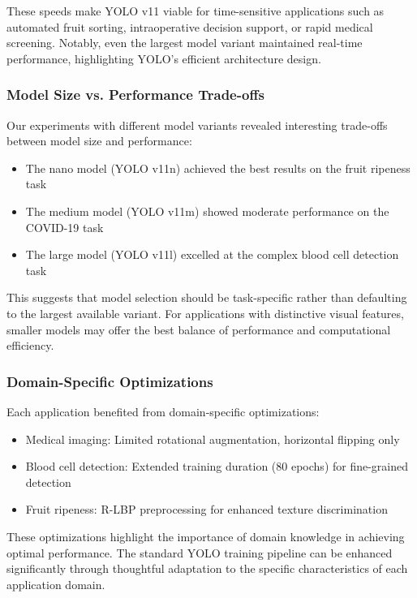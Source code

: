 \begin{multicols}{2}
These speeds make YOLO v11 viable for time-sensitive applications such as automated fruit sorting, intraoperative decision support, or rapid medical screening. Notably, even the largest model variant maintained real-time performance, highlighting YOLO's efficient architecture design.

\subsubsection{Model Size vs. Performance Trade-offs}

Our experiments with different model variants revealed interesting trade-offs between model size and performance:

\begin{itemize}
    \item The nano model (YOLO v11n) achieved the best results on the fruit ripeness task
    \item The medium model (YOLO v11m) showed moderate performance on the COVID-19 task
    \item The large model (YOLO v11l) excelled at the complex blood cell detection task
\end{itemize}

This suggests that model selection should be task-specific rather than defaulting to the largest available variant. For applications with distinctive visual features, smaller models may offer the best balance of performance and computational efficiency.

\subsubsection{Domain-Specific Optimizations}

Each application benefited from domain-specific optimizations:

\begin{itemize}
    \item Medical imaging: Limited rotational augmentation, horizontal flipping only
    \item Blood cell detection: Extended training duration (80 epochs) for fine-grained detection
    \item Fruit ripeness: R-LBP preprocessing for enhanced texture discrimination
\end{itemize}

These optimizations highlight the importance of domain knowledge in achieving optimal performance. The standard YOLO training pipeline can be enhanced significantly through thoughtful adaptation to the specific characteristics of each application domain.


\end{multicols}
